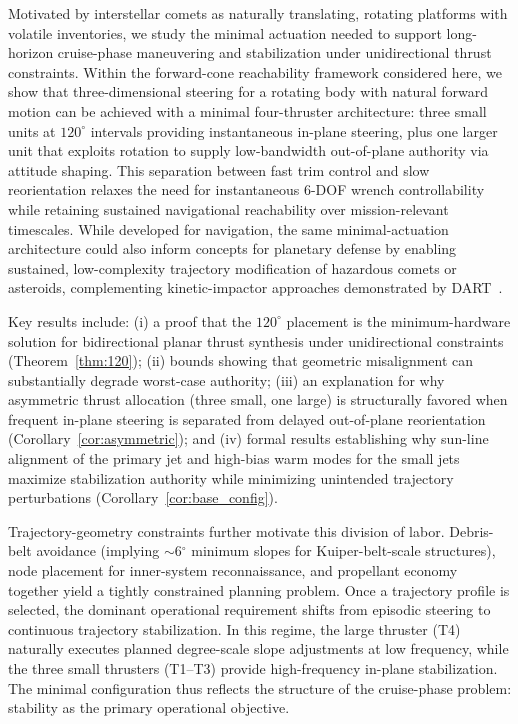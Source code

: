 \documentclass{article}
\begin{document}
Motivated by interstellar comets as naturally translating, rotating platforms with volatile inventories, we study the minimal actuation needed to support long-horizon cruise-phase maneuvering and stabilization under unidirectional thrust constraints. Within the forward-cone reachability framework considered here, we show that three-dimensional steering for a rotating body with natural forward motion can be achieved with a minimal four-thruster architecture: three small units at $120^\circ$ intervals providing instantaneous in-plane steering, plus one larger unit that exploits rotation to supply low-bandwidth out-of-plane authority via attitude shaping. This separation between fast trim control and slow reorientation relaxes the need for instantaneous 6-DOF wrench controllability while retaining sustained navigational reachability over mission-relevant timescales. While developed for navigation, the same minimal-actuation architecture could also inform concepts for planetary defense by enabling sustained, low-complexity trajectory modification of hazardous comets or asteroids, complementing kinetic-impactor approaches demonstrated by DART~\cite{daly2023dart,thomas2023dart}.

Key results include: (i) a proof that the $120^\circ$ placement is the minimum-hardware solution for bidirectional planar thrust synthesis under unidirectional constraints (Theorem~\ref{thm:120}); (ii) bounds showing that geometric misalignment can substantially degrade worst-case authority; (iii) an explanation for why asymmetric thrust allocation (three small, one large) is structurally favored when frequent in-plane steering is separated from delayed out-of-plane reorientation (Corollary~\ref{cor:asymmetric}); and (iv) formal results establishing why sun-line alignment of the primary jet and high-bias warm modes for the small jets maximize stabilization authority while minimizing unintended trajectory perturbations (Corollary~\ref{cor:base_config}).

Trajectory-geometry constraints further motivate this division of labor. Debris-belt avoidance (implying $\sim$6$^\circ$ minimum slopes for Kuiper-belt-scale structures), node placement for inner-system reconnaissance, and propellant economy together yield a tightly constrained planning problem. Once a trajectory profile is selected, the dominant operational requirement shifts from episodic steering to continuous trajectory stabilization. In this regime, the large thruster (T4) naturally executes planned degree-scale slope adjustments at low frequency, while the three small thrusters (T1--T3) provide high-frequency in-plane stabilization. The minimal configuration thus reflects the structure of the cruise-phase problem: stability as the primary operational objective.
\end{document}
